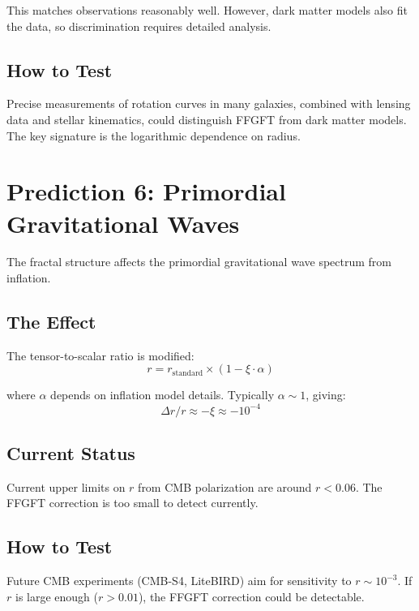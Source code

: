This matches observations reasonably well. However, dark matter models also fit the data, so discrimination requires detailed analysis.

\subsection{How to Test}

Precise measurements of rotation curves in many galaxies, combined with lensing data and stellar kinematics, could distinguish FFGFT from dark matter models. The key signature is the logarithmic dependence on radius.

\section{Prediction 6: Primordial Gravitational Waves}

The fractal structure affects the primordial gravitational wave spectrum from inflation.

\subsection{The Effect}

The tensor-to-scalar ratio is modified:
\begin{equation}
r = r_{\text{standard}} \times (1 - \xi \cdot \alpha)
\end{equation}

where $\alpha$ depends on inflation model details. Typically $\alpha \sim 1$, giving:
\begin{equation}
\Delta r / r \approx -\xi \approx -10^{-4}
\end{equation}

\subsection{Current Status}

Current upper limits on $r$ from CMB polarization are around $r < 0.06$. The FFGFT correction is too small to detect currently.

\subsection{How to Test}

Future CMB experiments (CMB-S4, LiteBIRD) aim for sensitivity to $r \sim 10^{-3}$. If $r$ is large enough ($r > 0.01$), the FFGFT correction could be detectable.

